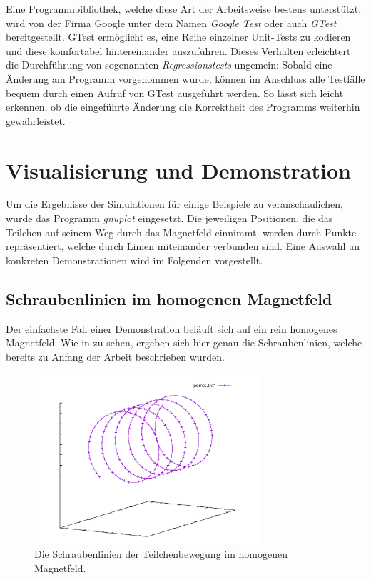 Eine Programmbibliothek, welche diese Art der Arbeitsweise bestens unterst\"utzt, wird von der Firma Google unter dem Namen
\textit{Google Test}
oder auch \textit{GTest} bereitgestellt. GTest erm\"oglicht es, eine Reihe einzelner Unit-Tests zu kodieren und diese komfortabel
hintereinander auszuf\"uhren. Dieses Verhalten erleichtert die Durchf\"uhrung von sogenannten \textit{Regressionstests} ungemein:
Sobald eine \"Anderung am Programm vorgenommen wurde, k\"onnen im Anschluss alle Testf\"alle bequem durch einen Aufruf von GTest
ausgef\"uhrt werden. So l\"asst sich leicht erkennen, ob die eingef\"uhrte  \"Anderung die Korrektheit des Programms weiterhin
gew\"ahrleistet.

\section{Visualisierung und Demonstration}

Um die Ergebnisse der Simulationen f\"ur einige Beispiele zu veranschaulichen, wurde das Programm \textit{gnuplot} eingesetzt.
Die jeweiligen Positionen, die das Teilchen auf seinem Weg durch das Magnetfeld einnimmt, werden durch Punkte repr\"asentiert,
welche durch Linien miteinander verbunden sind. Eine Auswahl an konkreten Demonstrationen wird im Folgenden vorgestellt.

\subsection{Schraubenlinien im homogenen Magnetfeld}

Der einfachste Fall einer Demonstration bel\"auft sich auf ein rein homogenes Magnetfeld. Wie in  zu sehen,
ergeben sich hier genau die Schraubenlinien, welche bereits zu Anfang der Arbeit beschrieben wurden.

\begin{figure}[h]
  \label{fig:homogeneous_plot}
  \centering
  \includegraphics[width=0.75\textwidth]{gnuplot/homogeneous}
  \caption{Die Schraubenlinien der Teilchenbewegung im homogenen Magnetfeld.}
\end{figure}

